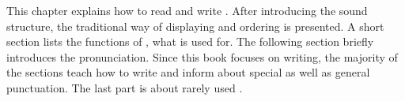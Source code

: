 
%
%

This chapter explains how to read and write \jkanavoc. After introducing the
sound structure, the traditional way of displaying and ordering \jtopic is
presented. A short section lists the functions of \jtopic, what \jtopic is used
for. The following section briefly introduces the pronunciation. Since this
book focuses on writing, the majority of the sections teach how to write
\jtopic and inform about special \jtopic as well as general punctuation. The
last part is about rarely used \jtopic.


